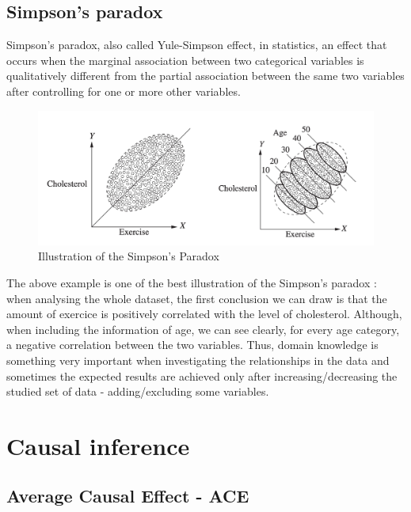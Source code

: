 \documentclass{article}
\begin{document}
 
 \subsection{Simpson's paradox}

Simpson’s paradox, also called Yule-Simpson effect, in statistics, an effect that occurs when the marginal association between two categorical variables is qualitatively different from the partial association between the same two variables after controlling for one or more other variables.

\begin{figure}[h]
\centering
\includegraphics[width=0.7 \textwidth]{figures/simpson.png}
\caption{Illustration of the Simpson’s Paradox\cite{pearl2016causal}}
\end{figure}

The above example is one of the best illustration of the Simpson's paradox : when analysing the whole dataset, the first conclusion we can draw is that the amount of exercice is positively correlated with the level of cholesterol. Although, when including the information of age, we can see clearly, for every age category, a negative correlation between the two variables. Thus, domain knowledge is something very important when investigating the relationships in the data and sometimes the expected results are achieved only after increasing/decreasing the studied set of data - adding/excluding some variables.

\newpage 

\section{Causal inference}


\subsection{Average Causal Effect - ACE}
\end{document}
